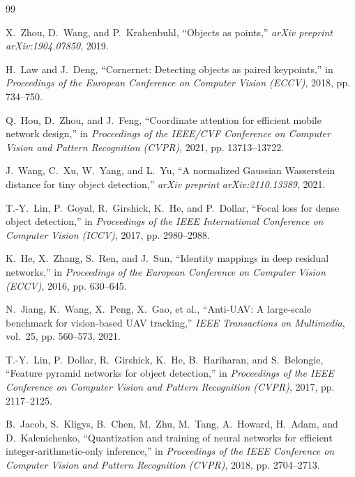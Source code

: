 \documentclass[11pt,a4paper]{article}
\begin{document}
\clearpage
\begingroup
\renewcommand{\refname}{Tài liệu tham khảo}
\begin{thebibliography}{99}

X.~Zhou, D.~Wang, and P.~Krahenbuhl, ``Objects as points,'' \emph{arXiv preprint arXiv:1904.07850}, 2019.

H.~Law and J.~Deng, ``Cornernet: Detecting objects as paired keypoints,'' in \emph{Proceedings of the European Conference on Computer Vision (ECCV)}, 2018, pp. 734--750.

Q.~Hou, D.~Zhou, and J.~Feng, ``Coordinate attention for efficient mobile network design,'' in \emph{Proceedings of the IEEE/CVF Conference on Computer Vision and Pattern Recognition (CVPR)}, 2021, pp. 13713--13722.

J.~Wang, C.~Xu, W.~Yang, and L.~Yu, ``A normalized Gaussian Wasserstein distance for tiny object detection,'' \emph{arXiv preprint arXiv:2110.13389}, 2021.

T.-Y.~Lin, P.~Goyal, R.~Girshick, K.~He, and P.~Dollar, ``Focal loss for dense object detection,'' in \emph{Proceedings of the IEEE International Conference on Computer Vision (ICCV)}, 2017, pp. 2980--2988.

K.~He, X.~Zhang, S.~Ren, and J.~Sun, ``Identity mappings in deep residual networks,'' in \emph{Proceedings of the European Conference on Computer Vision (ECCV)}, 2016, pp. 630--645.

N.~Jiang, K.~Wang, X.~Peng, X.~Gao, et al., ``Anti-UAV: A large-scale benchmark for vision-based UAV tracking,'' \emph{IEEE Transactions on Multimedia}, vol.~25, pp. 560--573, 2021.

T.-Y.~Lin, P.~Dollar, R.~Girshick, K.~He, B.~Hariharan, and S.~Belongie, ``Feature pyramid networks for object detection,'' in \emph{Proceedings of the IEEE Conference on Computer Vision and Pattern Recognition (CVPR)}, 2017, pp. 2117--2125.


B.~Jacob, S.~Kligys, B.~Chen, M.~Zhu, M.~Tang, A.~Howard, H.~Adam, and D.~Kalenichenko, ``Quantization and training of neural networks for efficient integer-arithmetic-only inference,'' in \emph{Proceedings of the IEEE Conference on Computer Vision and Pattern Recognition (CVPR)}, 2018, pp. 2704--2713.


\end{thebibliography}
\end{document}
